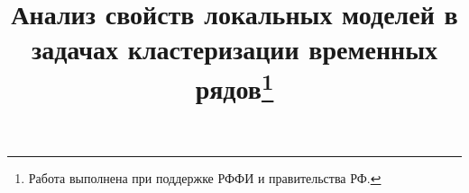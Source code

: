 \documentclass[12pt, twoside]{article}
\begin{document}

\title{\bf Анализ свойств локальных моделей в задачах кластеризации временных рядов\thanks{Работа выполнена при поддержке РФФИ и правительства РФ.}}
\date{}
\author{}
\maketitle

\end{document}
